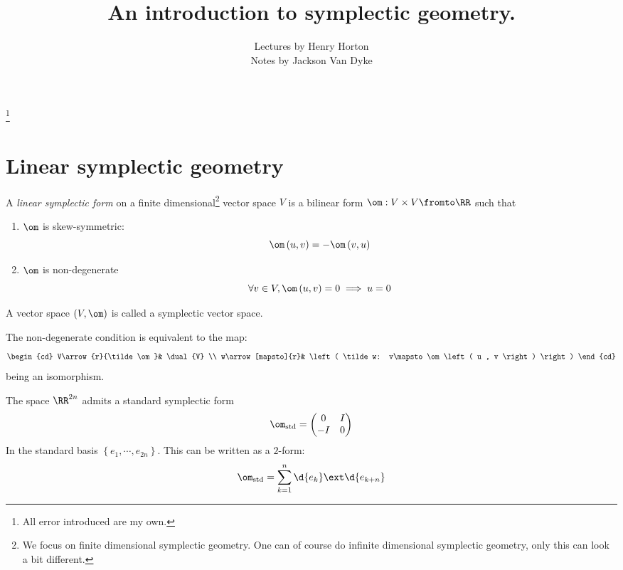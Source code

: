 \documentclass{amsart}
\begin{document}
\author{Lectures by Henry Horton\\
Notes by Jackson Van Dyke}
\thanks{All error introduced are my own.}
\title{An introduction to symplectic geometry.}
\maketitle

\section{Linear symplectic geometry}

\begin{defn}
A \emph{linear symplectic form} on a finite dimensional\footnote{We focus on finite dimensional
symplectic geometry. One can of course
do infinite dimensional symplectic geometry, only this can look a bit different.}
vector space $V$ is a bilinear
form $\om: V\times V\fromto \RR$ such that
\begin{enumerate}
\item $\om$ is skew-symmetric:
\begin{equation}
\om\left( u , v \right) = -\om\left( v , u \right)
\end{equation}
\item $\om$ is non-degenerate
\begin{equation}
\forall v\in V, \om\left( u , v \right) = 0
\implies u = 0
\end{equation}
\end{enumerate}
A vector space $\left( V , \om \right)$ is called a symplectic vector space.
\end{defn}

\begin{rmk}
The non-degenerate condition is equivalent to the map:
\begin{equation}
\begin{cd}
V\arrow{r}{\tilde \om}&
\dual{V} \\
w\arrow[mapsto]{r}&
\left( \tilde w: v\mapsto \om\left( u , v \right) \right)
\end{cd}
\end{equation}
being an isomorphism.
\end{rmk}

\begin{exm}
The space $\RR^{2n}$ admits a standard symplectic form
\begin{equation}
\om_{\text{std}} = 
\begin{pmatrix}
0 & I \\ -I & 0
\end{pmatrix}
\end{equation}
In the standard basis $\left\{ e_1, \cdots , e_{2n} \right\}$.
This can be written as a $2$-form:
\begin{equation}
\om_{\text{std}} = \sum_{k = 1}^n
\d{e_k} \ext \d{e_{k + n}}
\end{equation}
\end{exm}
\end{document}
